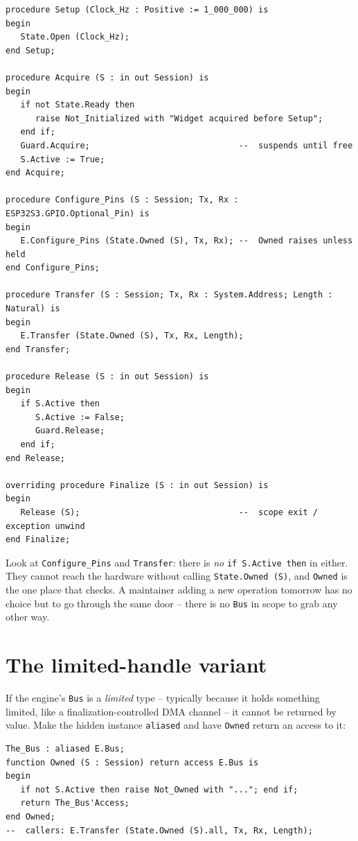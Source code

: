 \begin{lstlisting}
procedure Setup (Clock_Hz : Positive := 1_000_000) is
begin
   State.Open (Clock_Hz);
end Setup;

procedure Acquire (S : in out Session) is
begin
   if not State.Ready then
      raise Not_Initialized with "Widget acquired before Setup";
   end if;
   Guard.Acquire;                              --  suspends until free
   S.Active := True;
end Acquire;

procedure Configure_Pins (S : Session; Tx, Rx : ESP32S3.GPIO.Optional_Pin) is
begin
   E.Configure_Pins (State.Owned (S), Tx, Rx); --  Owned raises unless held
end Configure_Pins;

procedure Transfer (S : Session; Tx, Rx : System.Address; Length : Natural) is
begin
   E.Transfer (State.Owned (S), Tx, Rx, Length);
end Transfer;

procedure Release (S : in out Session) is
begin
   if S.Active then
      S.Active := False;
      Guard.Release;
   end if;
end Release;

overriding procedure Finalize (S : in out Session) is
begin
   Release (S);                                --  scope exit / exception unwind
end Finalize;
\end{lstlisting}

Look at \texttt{Configure\_Pins} and \texttt{Transfer}: there is \emph{no}
\texttt{if S.Active then} in either. They cannot reach the hardware without
calling \texttt{State.Owned (S)}, and \texttt{Owned} is the one place that checks.
A maintainer adding a new operation tomorrow has no choice but to go through the
same door -- there is no \texttt{Bus} in scope to grab any other way.

\section{The limited-handle variant}

If the engine's \texttt{Bus} is a \emph{limited} type -- typically because it
holds something limited, like a finalization-controlled DMA channel -- it cannot
be returned by value. Make the hidden instance \texttt{aliased} and have
\texttt{Owned} return an access to it:

\begin{lstlisting}
The_Bus : aliased E.Bus;
function Owned (S : Session) return access E.Bus is
begin
   if not S.Active then raise Not_Owned with "..."; end if;
   return The_Bus'Access;
end Owned;
--  callers: E.Transfer (State.Owned (S).all, Tx, Rx, Length);
\end{lstlisting}

